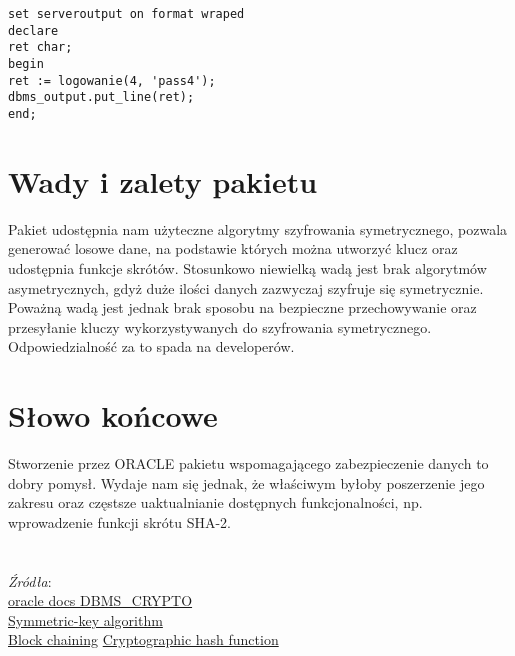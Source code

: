 \documentclass[12pt, a4paper]{article}
\begin{document}
\begin{lstlisting}
set serveroutput on format wraped
declare
ret char;
begin
ret := logowanie(4, 'pass4');
dbms_output.put_line(ret);
end;
\end{lstlisting} 


\section{Wady i zalety pakietu}
Pakiet udostępnia nam użyteczne algorytmy szyfrowania symetrycznego, pozwala generować losowe dane, na podstawie których można utworzyć klucz oraz udostępnia funkcje skrótów.
Stosunkowo niewielką wadą jest brak algorytmów asymetrycznych, gdyż duże ilości danych zazwyczaj szyfruje się symetrycznie. Poważną wadą jest jednak brak sposobu na bezpieczne przechowywanie oraz przesyłanie kluczy
wykorzystywanych do szyfrowania symetrycznego. Odpowiedzialność za to spada na developerów.

\section{Słowo końcowe}
Stworzenie przez ORACLE pakietu wspomagającego zabezpieczenie danych to dobry pomysł. Wydaje nam się jednak, że właściwym byłoby poszerzenie jego zakresu 
oraz częstsze uaktualnianie dostępnych funkcjonalności, np. wprowadzenie funkcji skrótu SHA-2.
\\\\\\
\emph{Źródła}:\\
\href{http://docs.oracle.com/cd/E11882_01/appdev.112/e25788/d_crypto.htm}{oracle
docs DBMS\_CRYPTO}\\
\href{http://en.wikipedia.org/wiki/Symmetric-key_algorithm}{Symmetric-key
algorithm}\\
\href{http://en.wikipedia.org/wiki/Block_cipher_modes_of_operation}{Block
chaining}
\href{http://en.wikipedia.org/wiki/Cryptographic_hash_function}{Cryptographic
hash function}
\end{document}
